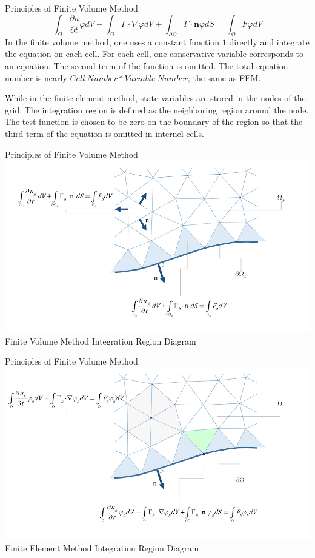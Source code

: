 \begin{frame}{Principles of Finite Volume Method}
\begin{equation*}
\int_{\Omega} \frac{\partial u}{\partial t} \varphi d V-\int_{\Omega} \Gamma \cdot \nabla \varphi d V+\int_{\partial \Omega} \Gamma \cdot \mathbf{n} \varphi d S=\int_{\Omega} F \varphi d V
\end{equation*}
In the \alert{finite volume method}, one uses a constant function $1$ directly and integrate the equation on each cell. For each cell, one conservative variable corresponds to an equation. The second term of the function is omitted. The total equation number is nearly $Cell\ Number * Variable\ Number$, the same as FEM.  

While in the \alert{finite element method}, state variables are stored in the nodes of the grid. The integration region is defined as the neighboring region around the node. The test function is chosen to be zero on the boundary of the region so that the third term of the equation is omitted in internel cells.
\end{frame}
\begin{frame}{Principles of Finite Volume Method}
\includegraphics[width=\linewidth]{figures/integrated-flux-internal-cells.png}\\
Finite Volume Method Integration Region Diagram
\end{frame}

\begin{frame}{Principles of Finite Volume Method}
\includegraphics[width=\linewidth]{figures/domain-contribution-internal-elements.png}\\
Finite Element Method Integration Region Diagram
\end{frame}


